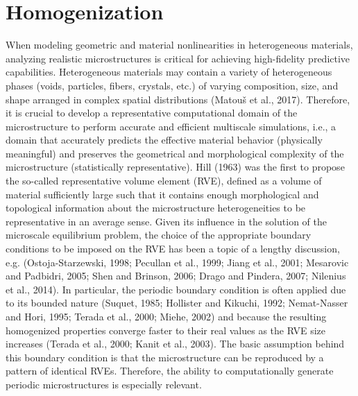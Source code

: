 \chapter{Homogenization}

When modeling geometric and material nonlinearities in heterogeneous materials, analyzing realistic microstructures is critical for achieving high-fidelity predictive capabilities.
Heterogeneous materials may contain a variety of heterogeneous phases (voids, particles, fibers, crystals, etc.) of varying composition, size, and shape arranged in complex spatial distributions (Matouš et al., 2017).
Therefore, it is crucial to develop a representative computational domain of the microstructure to perform accurate and efficient multiscale simulations, i.e., a domain that accurately predicts the effective material behavior (physically meaningful) and preserves the geometrical and morphological complexity of the microstructure (statistically representative).
Hill (1963) was the first to propose the so-called representative volume element (RVE), defined as a volume of material sufficiently large such that it contains enough morphological and topological information about the microstructure heterogeneities to be representative in an average sense.
Given its influence in the solution of the microscale equilibrium problem, the choice of the appropriate boundary conditions to be imposed on the RVE has been a topic of a lengthy discussion, e.g. (Ostoja-Starzewski, 1998; Pecullan et al., 1999; Jiang et al., 2001; Mesarovic and Padbidri, 2005; Shen and Brinson, 2006; Drago and Pindera, 2007; Nilenius et al., 2014).
In particular, the periodic boundary condition is often applied due to its bounded nature (Suquet, 1985; Hollister and Kikuchi, 1992; Nemat-Nasser and Hori, 1995; Terada et al., 2000; Miehe, 2002) and because the resulting homogenized properties converge faster to their real values as the RVE size increases (Terada et al., 2000; Kanit et al., 2003).
The basic assumption behind this boundary condition is that the microstructure can be reproduced by a pattern of identical RVEs.
Therefore, the ability to computationally generate periodic microstructures is especially relevant.
